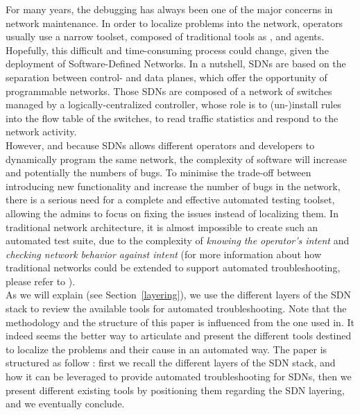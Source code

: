 \documentclass[10pt,article]{IEEEtran}
\begin{document}
For many years, the debugging has always been one of the major concerns in network maintenance. In order to localize problems into the network, operators usually use a narrow toolset, composed of traditional tools as \verb@ping@, \verb@traceroute@ and \verb@SNMP@ agents\cite{zeng2012automatic}.\\
Hopefully, this difficult and time-consuming\cite{zeng2012automatic} process could change, given the deployment of Software-Defined Networks. In a nutshell, SDNs are based on the separation between control- and data planes, which offer the opportunity of programmable networks\cite{mckeown2008openflow}. Those SDNs are composed of a network of switches managed by a logically-centralized controller, whose role is to (un-)install rules into the flow table of the switches, to read traffic statistics and respond to the network activity.\\
However, and because SDNs allows different operators and developers to dynamically program the same network, the complexity of software will increase\cite{Sherwood:2010:PNT:1924943.1924969} and potentially the numbers of bugs.
To minimise the trade-off between introducing new functionality and  increase the number of bugs in the network, there is a serious need for a complete and effective automated testing toolset, allowing the admins to focus on fixing the issues instead of localizing them. In traditional network architecture, it is almost impossible to create such an automated test suite, due to the complexity of \textit{knowing the operator's intent} and \textit{checking network behavior against intent}\cite{Heller:2013:LSL:2491185.2491197} (for more information about how traditional networks could be extended to support automated troubleshooting, please refer to \cite{Heller:2013:LSL:2491185.2491197}).\\
As we will explain (see Section~\ref{layering}), we use the different layers of the SDN stack to review the available tools for automated troubleshooting. Note that the methodology and the structure of this paper is influenced from the one used in\cite{Heller:2013:LSL:2491185.2491197}. It indeed seems the better way to articulate and present the different tools destined to localize the problems and their cause in an automated way.
The paper is structured as follow : first we recall the different layers of the SDN stack, and how it can be leveraged to provide automated troubleshooting for SDNs, then we present different existing tools by positioning them regarding the SDN layering, and we eventually conclude.
\end{document}
